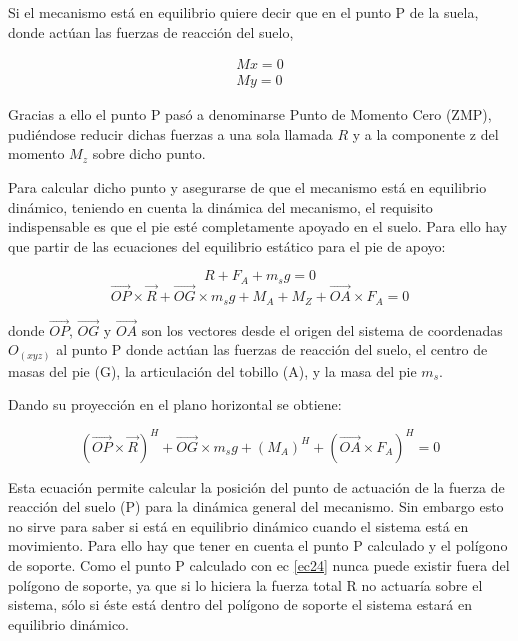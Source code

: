 Si el mecanismo está en equilibrio quiere decir que en el punto P de la suela, donde actúan las fuerzas de reacción del suelo,

\begin{equation}
\begin{split}
Mx=0\\
My=0
\end{split}
\label{ec21}
\end{equation}

Gracias a ello el punto P pasó a denominarse Punto de Momento Cero (ZMP), pudiéndose reducir dichas fuerzas a una sola llamada $R$ y a la componente z del momento $M_z$ sobre dicho punto.

Para calcular dicho punto y asegurarse de que el mecanismo está en equilibrio dinámico, teniendo en cuenta la dinámica del mecanismo, el requisito indispensable es que el pie esté completamente apoyado en el suelo. Para ello hay que partir de las ecuaciones del equilibrio estático para el pie de apoyo:

\begin{equation}
R+F_A+m_sg=0
\label{ec22}
\end{equation}
\begin{equation}
\overrightarrow{OP} \times \overrightarrow{R}+\overrightarrow{OG} \times m_sg + M_A+M_Z+\overrightarrow{OA} \times F_A=0
\label{ec23}
\end{equation}

donde $\overrightarrow{OP}$, $\overrightarrow{OG}$ y $\overrightarrow{OA}$ son los vectores desde el origen del sistema de coordenadas $O_(xyz)$ al punto P donde actúan las fuerzas de reacción del suelo, el centro de masas del pie (G), la articulación del tobillo (A), y la masa del pie $m_s$.

Dando su proyección en el plano horizontal se obtiene:

\begin{equation}
(\overrightarrow{OP} \times \overrightarrow{R})^H+\overrightarrow{OG} \times m_sg+ (M_A)^H+(\overrightarrow{OA} \times F_A)^H=0 
\label{ec24}
\end{equation}

Esta ecuación permite calcular la posición del punto de actuación de la fuerza de reacción del suelo (P) para la dinámica general del mecanismo. Sin embargo esto no sirve para saber si está en equilibrio dinámico cuando el sistema está en movimiento. Para ello hay que tener en cuenta el punto P calculado y el polígono de soporte. Como el punto P calculado con ec \eqref{ec24} nunca puede existir fuera del polígono de soporte, ya que si lo hiciera la fuerza total R no actuaría sobre el sistema, sólo si éste está dentro del polígono de soporte el sistema estará en equilibrio dinámico.

